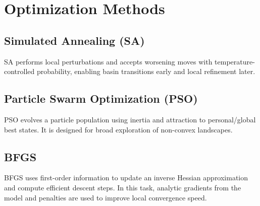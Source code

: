 \chapter{Optimization Methods}

\section{Simulated Annealing (SA)}
SA performs local perturbations and accepts worsening moves with temperature-controlled probability, enabling basin transitions early and local refinement later.

\section{Particle Swarm Optimization (PSO)}
PSO evolves a particle population using inertia and attraction to personal/global best states.
It is designed for broad exploration of non-convex landscapes.

\section{BFGS}
BFGS uses first-order information to update an inverse Hessian approximation and compute efficient descent steps.
In this task, analytic gradients from the model and penalties are used to improve local convergence speed.
